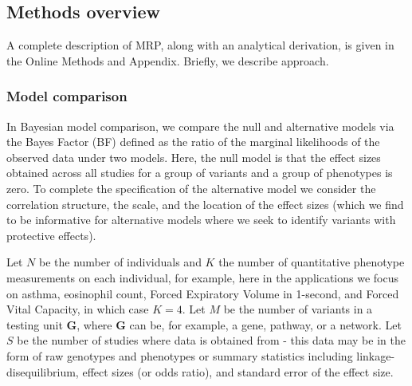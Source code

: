 \documentclass{nature}
\def\bs{\boldsymbol}
\begin{document}
\subsection{Methods overview}
A complete description of MRP, along with an analytical derivation, is given in the Online Methods and Appendix. Briefly, we describe approach.

\subsubsection{Model comparison}
In Bayesian model comparison, we compare the null and alternative models via the Bayes Factor (BF) defined as the ratio of the marginal likelihoods of the observed data under two models. Here, the null model is that the effect sizes obtained across all studies for a group of variants and a group of phenotypes is zero. To complete the specification of the alternative model we consider the correlation structure, the scale, and the location of the effect sizes (which we find to be informative for alternative models where we seek to identify variants with protective effects). 

Let $N$ be the number of individuals and $K$ the number of quantitative phenotype measurements on each individual, for example, here in the applications we focus on asthma, eosinophil count, Forced Expiratory Volume in 1-second, and Forced Vital Capacity, in which case $K=4$. Let $M$ be the number of variants in a testing unit ${\bs G}$, where ${\bs G}$ can be, for example, a gene, pathway, or a network. Let $S$ be the number of studies where data is obtained from - this data may be in the form of raw genotypes and phenotypes or summary statistics including linkage-disequilibrium, effect sizes (or odds ratio), and standard error of the effect size.
\end{document}
